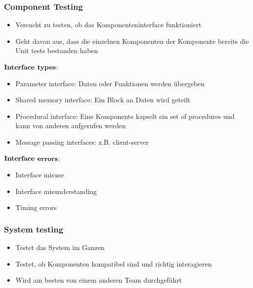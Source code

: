 \subsubsection{Component Testing}
\begin{itemize}
	\item Versucht zu testen, ob das Komponenteninterface funktioniert
	\item Geht davon aus, dass die einzelnen Komponenten der Komponente bereits die Unit tests bestanden haben
\end{itemize}
$\bold{Interface}$ $\bold{types}$:
\begin{itemize}
	\item Parameter interface: Daten oder Funktionen werden übergeben
	\item Shared memory interface: Ein Block an Daten wird geteilt
	\item Procedural interface: Eine Komponente kapselt ein set of procedures und kann von anderen aufgerufen werden
	\item Message passing interfaces: z.B. client-server 
\end{itemize}
$\bold{Interface}$ $\bold{errors}$:
\begin{itemize}
	\item Interface misuse
	\item Interface misunderstanding
	\item Timing errors
\end{itemize}
\subsubsection{System testing}
\begin{itemize}
	\item Testet das System im Ganzen
	\item Testet, ob Komponenten kompatibel sind und richtig interagieren
	\item Wird am besten von einem anderen Team durchgeführt
\end{itemize}
